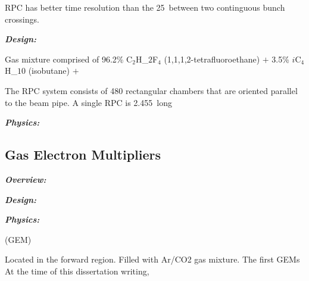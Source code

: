 RPC has better time resolution than the 25~\ns between two continguous \pp bunch crossings.

\textbf{\textit{Design:}}

Gas mixture comprised of 96.2\% C$_{2}$H_${2}$F$_{4}$ (1,1,1,2-tetrafluoroethane) $+$ 3.5\% $i$C$_{4}$H_$10$ (isobutane) $+$ 

The RPC system consists of 480 rectangular chambers that are oriented parallel to the beam pipe.
A single RPC is 2.455~\mm long 


\textbf{\textit{Physics:}}

\subsection{Gas Electron Multipliers}
\label{subsec:gem}

\textbf{\textit{Overview:}}

\textbf{\textit{Design:}}

\textbf{\textit{Physics:}}

(GEM)

Located in the forward region.
Filled with Ar/CO2 gas mixture.
The first GEMs At the time of this dissertation writing, 








